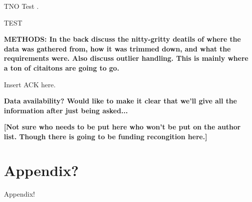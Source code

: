 \documentclass[twocolumn,linenumbers]{aastex631}
\begin{document}
TNO Test \citep{Brown2017}. 

TEST \citep{Morin2010}

\textbf{\color{blue}METHODS: In the back discuss the nitty-gritty deatils of where the data was gathered from, how it was trimmed down, and what the requirements were. Also discuss outlier handling. This is mainly where a ton of citaitons are going to go. \color{black}}

\begin{acknowledgments}
Insert ACK here. 

\textbf{\color{blue}Data availability? Would like to make it clear that we'll give all the information after just being asked...\color{black}}

\textbf{\color{red}[Not sure who needs to be put here who won't be put on the author list. Though there is going to be funding recongition here.]\color{black}}
\end{acknowledgments}

\appendix

\section{Appendix?}

Appendix!

{}

\end{document}
